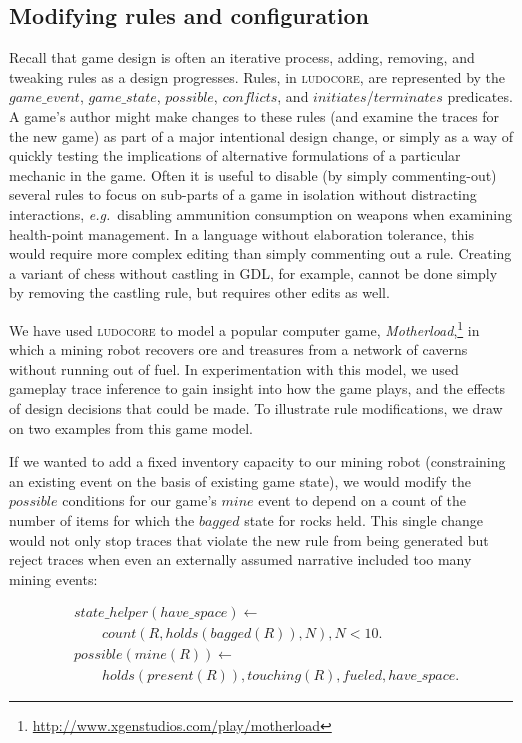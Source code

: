 \documentclass[letterpaper]{article}
\newcommand{\ludocore}{\textsc{ludocore}}
\newcommand{\snippet}[1]{{\vspace{-0.4cm}\footnotesize\begin{align*}#1\end{align*}\vspace{-0.4cm}}}
\newcommand{\logical}[1]{$#1$}
\begin{document}
\subsection{Modifying rules and configuration}

Recall that game design is often an iterative process, adding, removing, and
tweaking rules as a design progresses. Rules, in \ludocore, are represented by
the \logical{game\_event}, \logical{game\_state}, \logical{possible},
\logical{conflicts}, and \logical{initiates}/\logical{terminates} predicates. A
game's author might make changes to these rules (and examine the traces for the
new game) as part of a major intentional design change, or simply as a way of
quickly testing the implications of alternative formulations of a particular
mechanic in the game. Often it is useful to disable (by simply commenting-out)
several rules to focus on sub-parts of a game in isolation without distracting
interactions, \emph{e.g.}\ disabling ammunition consumption on weapons when
examining health-point management. In a language without elaboration tolerance,
this would require more complex editing than simply commenting out a rule. Creating
a variant of chess without castling in GDL, for example, cannot be done simply
by removing the castling rule, but requires other edits as well.

We have used \ludocore{} to model a popular computer game,
\emph{Motherload},\footnote{\url{http://www.xgenstudios.com/play/motherload}}
in which a mining robot recovers ore and treasures from a network of caverns
without running out of fuel. In experimentation with this model, we used
gameplay trace inference to gain insight into how the game plays, and the
effects of design decisions that could be made. To illustrate rule
modifications, we draw on two examples from this game model.

If we wanted to add a fixed inventory capacity to our mining robot
(constraining an existing event on the basis of existing game state), we would
modify the \logical{possible} conditions for our game's \logical{mine} event to
depend on a count of the number of items for which the \logical{bagged} state
for rocks held. This single change would not only stop traces that violate the
new rule from being generated but reject traces when even an externally assumed
narrative included too many mining events:

\snippet{&state\_helper(have\_space) \leftarrow\\&\qquad count(R,holds(bagged(R)),N), N<10.\\
&possible(mine(R)) \leftarrow\\&\qquad holds(present(R)), touching(R), fueled, have\_space.}
\end{document}
